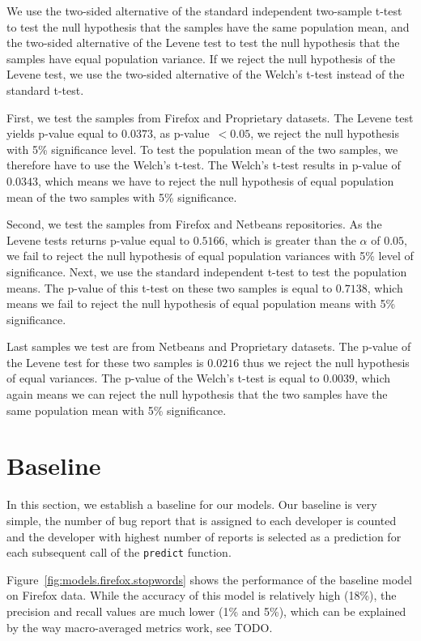 We use the two-sided alternative of the standard independent two-sample t-test to test the null hypothesis that the samples have the same population mean, and the two-sided alternative of the Levene test to test the null hypothesis that the samples have equal population variance. If we reject the null hypothesis of the Levene test, we use the two-sided alternative of the Welch's t-test instead of the standard t-test.

First, we test the samples from Firefox and Proprietary datasets. The Levene test yields p-value equal to $0.0373$, as p-value~$< 0.05$, we reject the null hypothesis with 5\% significance level. To test the population mean of the two samples, we therefore have to use the Welch's t-test. The Welch's t-test results in p-value of $0.0343$, which means we have to reject the null hypothesis of equal population mean of the two samples with 5\% significance.

Second, we test the samples from Firefox and Netbeans repositories. As the Levene tests returns p-value equal to $0.5166$, which is greater than the $\alpha$ of $0.05$, we fail to reject the null hypothesis of equal population variances with 5\% level of significance. Next, we use the standard independent t-test to test the population means. The p-value of this t-test on these two samples is equal to $0.7138$, which means we fail to reject the null hypothesis of equal population means with 5\% significance.

Last samples we test are from Netbeans and Proprietary datasets. The p-value of the Levene test for these two samples is $0.0216$ thus we reject the null hypothesis of equal variances. The p-value of the Welch's t-test is equal to $0.0039$, which again means we can reject the null hypothesis that the two samples have the same population mean with 5\% significance. 

\section{Baseline}

In this section, we establish a baseline for our models. Our baseline is very simple, the number of bug report that is assigned to each developer is counted and the developer with highest number of reports is selected as a prediction for each subsequent call of the \texttt{predict} function.

Figure~\ref{fig:models.firefox.stopwords} shows the performance of the baseline model on Firefox data. While the accuracy of this model is relatively high (18\%), the precision and recall values are much lower (1\% and 5\%), which can be explained by the way macro-averaged metrics work, see TODO. 

